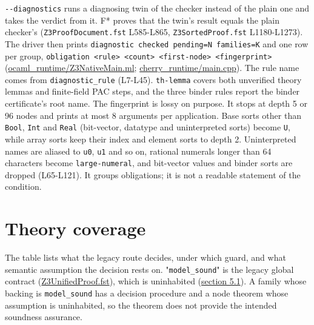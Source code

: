 \documentclass[10pt,a4paper]{article}
\begin{document}
\texttt{-{}\allowbreak{}-{}\allowbreak{}diagnostics} runs a diagnosing twin of the checker instead of the plain one and takes the verdict from it. F* proves that the twin's result equals the plain checker's (\texttt{Z3ProofDocument.\allowbreak{}fst} L585-L865, \texttt{Z3SortedProof.\allowbreak{}fst} L1180-L1273). The driver then prints \texttt{diagnostic checked pending=\allowbreak{}N families=\allowbreak{}K} and one row per group, \texttt{obligation <rule> <count> <first-{}\allowbreak{}node> <fingerprint>} (\href{https://github.com/Z3Prover/z3/blob/8fbb275aba0472e862e289c7af1331b3bd5d512c/fstar/ocaml_runtime/Z3NativeMain.ml\#L126-L154}{ocaml\_\allowbreak{}runtime/\allowbreak{}Z3Native\allowbreak{}Main.\allowbreak{}ml}; \href{https://github.com/Z3Prover/z3/blob/8fbb275aba0472e862e289c7af1331b3bd5d512c/fstar/cherry_runtime/main.cpp\#L234-L280}{cherry\_\allowbreak{}runtime/\allowbreak{}main.\allowbreak{}cpp}). The rule name comes from \texttt{diagnostic\_\allowbreak{}rule} (L7-L45). \texttt{th-{}\allowbreak{}lemma} covers both unverified theory lemmas and finite-field PAC steps, and the three binder rules report the binder certificate's root name. The fingerprint is lossy on purpose. It stops at depth 5 or 96 nodes and prints at most 8 arguments per application. Base sorts other than \texttt{Bool}, \texttt{Int} and \texttt{Real} (bit-vector, datatype and uninterpreted sorts) become \texttt{U}, while array sorts keep their index and element sorts to depth 2. Uninterpreted names are aliased to \texttt{u0}, \texttt{u1} and so on, rational numerals longer than 64 characters become \texttt{large-{}\allowbreak{}numeral}, and bit-vector values and binder sorts are dropped (L65-L121). It groups obligations; it is not a readable statement of the condition.

\section{Theory coverage}\label{sec:4-theory-coverage}

The table lists what the legacy route decides, under which guard, and what semantic assumption the decision rests on. "\texttt{model\_\allowbreak{}sound}" is the legacy global contract (\href{https://github.com/Z3Prover/z3/blob/8fbb275aba0472e862e289c7af1331b3bd5d512c/fstar/Z3UnifiedProof.fst\#L1164-L1175}{Z3Unified\allowbreak{}Proof.\allowbreak{}fst}), which is uninhabited (\hyperref[sec:51-the-legacy-global-contract-is-uninhabited]{section 5.1}). A family whose backing is \texttt{model\_\allowbreak{}sound} has a decision procedure and a node theorem whose assumption is uninhabited, so the theorem does not provide the intended soundness assurance.
\end{document}
